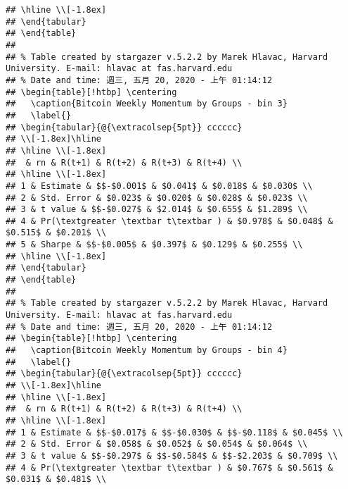 \documentclass[
]{article}
\begin{document}
\begin{verbatim}
## \hline \\[-1.8ex] 
## \end{tabular} 
## \end{table} 
## 
## % Table created by stargazer v.5.2.2 by Marek Hlavac, Harvard University. E-mail: hlavac at fas.harvard.edu
## % Date and time: 週三, 五月 20, 2020 - 上午 01:14:12
## \begin{table}[!htbp] \centering 
##   \caption{Bitcoin Weekly Momentum by Groups - bin 3} 
##   \label{} 
## \begin{tabular}{@{\extracolsep{5pt}} cccccc} 
## \\[-1.8ex]\hline 
## \hline \\[-1.8ex] 
##  & rn & R(t+1) & R(t+2) & R(t+3) & R(t+4) \\ 
## \hline \\[-1.8ex] 
## 1 & Estimate & $$-$0.001$ & $0.041$ & $0.018$ & $0.030$ \\ 
## 2 & Std. Error & $0.023$ & $0.020$ & $0.028$ & $0.023$ \\ 
## 3 & t value & $$-$0.027$ & $2.014$ & $0.655$ & $1.289$ \\ 
## 4 & Pr(\textgreater \textbar t\textbar ) & $0.978$ & $0.048$ & $0.515$ & $0.201$ \\ 
## 5 & Sharpe & $$-$0.005$ & $0.397$ & $0.129$ & $0.255$ \\ 
## \hline \\[-1.8ex] 
## \end{tabular} 
## \end{table} 
## 
## % Table created by stargazer v.5.2.2 by Marek Hlavac, Harvard University. E-mail: hlavac at fas.harvard.edu
## % Date and time: 週三, 五月 20, 2020 - 上午 01:14:12
## \begin{table}[!htbp] \centering 
##   \caption{Bitcoin Weekly Momentum by Groups - bin 4} 
##   \label{} 
## \begin{tabular}{@{\extracolsep{5pt}} cccccc} 
## \\[-1.8ex]\hline 
## \hline \\[-1.8ex] 
##  & rn & R(t+1) & R(t+2) & R(t+3) & R(t+4) \\ 
## \hline \\[-1.8ex] 
## 1 & Estimate & $$-$0.017$ & $$-$0.030$ & $$-$0.118$ & $0.045$ \\ 
## 2 & Std. Error & $0.058$ & $0.052$ & $0.054$ & $0.064$ \\ 
## 3 & t value & $$-$0.297$ & $$-$0.584$ & $$-$2.203$ & $0.709$ \\ 
## 4 & Pr(\textgreater \textbar t\textbar ) & $0.767$ & $0.561$ & $0.031$ & $0.481$ \\ 

\end{verbatim}
\end{document}
